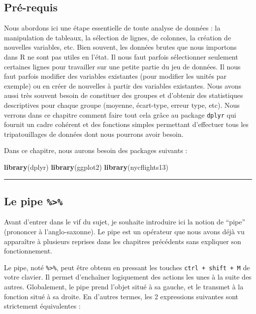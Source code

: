 \documentclass[a4paperpaper,]{article}
\newenvironment{Shaded}{\begin{snugshade}}{\end{snugshade}}
\newcommand{\KeywordTok}[1]{\textcolor[rgb]{0.12,0.11,0.11}{\textbf{#1}}}
\newcommand{\NormalTok}[1]{\textcolor[rgb]{0.12,0.11,0.11}{#1}}
\begin{document}
\hypertarget{pre-requis}{%
\subsection{Pré-requis}\label{pre-requis}}

Nous abordons ici une étape essentielle de toute analyse de données : la manipulation de tableaux, la sélection de lignes, de colonnes, la création de nouvelles variables, etc. Bien souvent, les données brutes que nous importons dans R ne sont pas utiles en l'état. Il nous faut parfois sélectionner seulement certaines lignes pour travailler sur une petite partie du jeu de données. Il nous faut parfois modifier des variables existantes (pour modifier les unités par exemple) ou en créer de nouvelles à partir des variables existantes. Nous avons aussi très souvent besoin de constituer des groupes et d'obtenir des statistiques descriptives pour chaque groupe (moyenne, écart-type, erreur type, etc). Nous verrons dans ce chapitre comment faire tout cela grâce au package \texttt{dplyr} qui fournit un cadre cohérent et des fonctions simples permettant d'effectuer tous les tripatouillages de données dont nous pourrons avoir besoin.

Dans ce chapitre, nous aurons besoin des packages suivants :

\begin{Shaded}
\begin{Highlighting}[]
\KeywordTok{library}\NormalTok{(dplyr)}
\KeywordTok{library}\NormalTok{(ggplot2)}
\KeywordTok{library}\NormalTok{(nycflights13)}
\end{Highlighting}
\end{Shaded}

\begin{center}\rule{0.5\linewidth}{\linethickness}\end{center}

\hypertarget{le-pipe}{%
\subsection{\texorpdfstring{Le pipe \texttt{\%\textgreater{}\%}}{Le pipe \%\textgreater{}\%}}\label{le-pipe}}

Avant d'entrer dans le vif du sujet, je souhaite introduire ici la notion de ``pipe'' (prononcer à l'anglo-saxonne). Le pipe est un opérateur que nous avons déjà vu apparaître à plusieurs reprises dans les chapitres précédents sans expliquer son fonctionnement.

Le pipe, noté \texttt{\%\textgreater{}\%}, peut être obtenu en pressant les touches \texttt{ctrl\ +\ shift\ +\ M} de votre clavier. Il permet d'enchaîner logiquement des actions les unes à la suite des autres. Globalement, le pipe prend l'objet situé à sa gauche, et le transmet à la fonction situé à sa droite. En d'autres termes, les 2 expressions suivantes sont strictement équivalentes :
\end{document}
